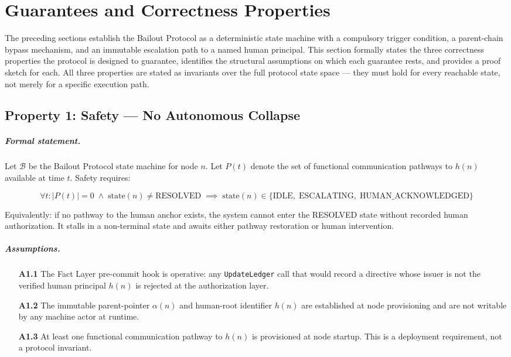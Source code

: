 \section{Guarantees and Correctness Properties}
\label{sec:properties}

The preceding sections establish the Bailout Protocol as a deterministic state machine with a compulsory trigger condition, a parent-chain bypass mechanism, and an immutable escalation path to a named human principal. This section formally states the three correctness properties the protocol is designed to guarantee, identifies the structural assumptions on which each guarantee rests, and provides a proof sketch for each. All three properties are stated as invariants over the full protocol state space --- they must hold for every reachable state, not merely for a specific execution path.

\subsection{Property 1: Safety --- No Autonomous Collapse}


\subparagraph{Formal statement.} Let $\mathcal{B}$ be the Bailout Protocol state machine for node $n$. Let $P(t)$ denote the set of functional communication pathways to $h(n)$ available at time $t$. Safety requires:

\begin{equation}
\forall t : |P(t)| = 0 \;\wedge\; \text{state}(n) \neq \text{RESOLVED}
\;\implies\;
\text{state}(n) \in \{\text{IDLE},\; \text{ESCALATING},\; \text{HUMAN\_ACKNOWLEDGED}\}
\end{equation}

Equivalently: if no pathway to the human anchor exists, the system cannot enter the RESOLVED state without recorded human authorization. It stalls in a non-terminal state and awaits either pathway restoration or human intervention.

\subparagraph{Assumptions.}
\begin{enumerate}
\item[\textbf{A1.1}] The Fact Layer pre-commit hook is operative: any \texttt{UpdateLedger} call that would record a directive whose issuer is not the verified human principal $h(n)$ is rejected at the authorization layer.
\item[\textbf{A1.2}] The immutable parent-pointer $\alpha(n)$ and human-root identifier $h(n)$ are established at node provisioning and are not writable by any machine actor at runtime.
\item[\textbf{A1.3}] At least one functional communication pathway to $h(n)$ is provisioned at node startup. This is a deployment requirement, not a protocol invariant.
\end{enumerate}

